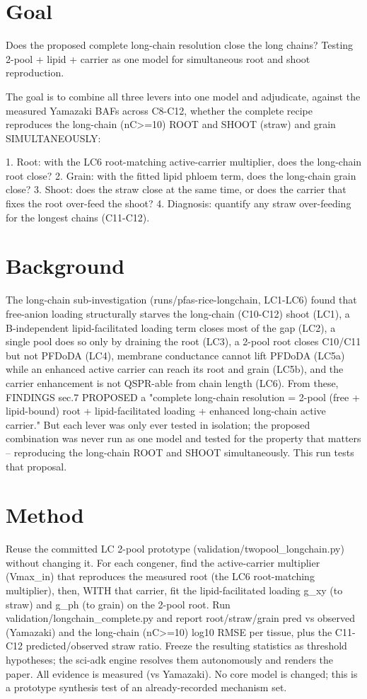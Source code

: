 \documentclass{article}
\begin{document}
\section{Goal}
Does the proposed complete long-chain resolution close the long chains? Testing 2-pool + lipid + carrier as one model for simultaneous root and shoot reproduction.

The goal is to combine all three levers into one model and adjudicate, against the
measured Yamazaki BAFs across C8-C12, whether the complete recipe reproduces the
long-chain (nC>=10) ROOT and SHOOT (straw) and grain SIMULTANEOUSLY:

1. Root: with the LC6 root-matching active-carrier multiplier, does the long-chain
   root close?
2. Grain: with the fitted lipid phloem term, does the long-chain grain close?
3. Shoot: does the straw close at the same time, or does the carrier that fixes the
   root over-feed the shoot?
4. Diagnosis: quantify any straw over-feeding for the longest chains (C11-C12).

\section{Background}
The long-chain sub-investigation (runs/pfas-rice-longchain, LC1-LC6) found that
free-anion loading structurally starves the long-chain (C10-C12) shoot (LC1), a
B-independent lipid-facilitated loading term closes most of the gap (LC2), a
single pool does so only by draining the root (LC3), a 2-pool root closes C10/C11
but not PFDoDA (LC4), membrane conductance cannot lift PFDoDA (LC5a) while an
enhanced active carrier can reach its root and grain (LC5b), and the carrier
enhancement is not QSPR-able from chain length (LC6). From these, FINDINGS sec.7
PROPOSED a "complete long-chain resolution = 2-pool (free + lipid-bound) root +
lipid-facilitated loading + enhanced long-chain active carrier." But each lever
was only ever tested in isolation; the proposed combination was never run as one
model and tested for the property that matters -- reproducing the long-chain ROOT
and SHOOT simultaneously. This run tests that proposal.

\section{Method}
Reuse the committed LC 2-pool prototype (validation/twopool\_longchain.py) without
changing it. For each congener, find the active-carrier multiplier (Vmax\_in) that
reproduces the measured root (the LC6 root-matching multiplier), then, WITH that
carrier, fit the lipid-facilitated loading g\_xy (to straw) and g\_ph (to grain) on
the 2-pool root. Run validation/longchain\_complete.py and report root/straw/grain
pred vs observed (Yamazaki) and the long-chain (nC>=10) log10 RMSE per tissue, plus
the C11-C12 predicted/observed straw ratio. Freeze the resulting statistics as
threshold hypotheses; the sci-adk engine resolves them autonomously and renders the
paper. All evidence is measured (vs Yamazaki). No core model is changed; this is a
prototype synthesis test of an already-recorded mechanism set.
\end{document}
